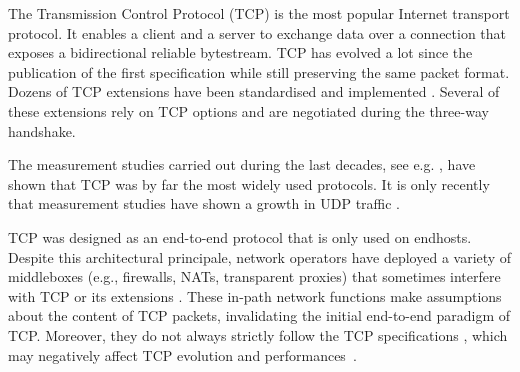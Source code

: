 
The Transmission Control Protocol (TCP) \cite{rfc793} is the most
popular Internet transport protocol. It enables a client and a server
to exchange data over a connection that exposes a bidirectional
reliable bytestream. 
TCP has evolved a lot since the publication of
the first specification while still preserving the same packet
format. Dozens of TCP extensions have been standardised and
implemented \cite{RFC7414}. Several of these extensions rely on TCP
options and are negotiated during the three-way handshake.

The measurement studies carried out during the last decades, see
e.g. \cite{paxson1994growth,claffy1993traffic,maier2009dominant,trevisan2020five},
have shown that TCP was by far the most widely used protocols. It is
only recently that measurement studies have shown a growth in UDP
traffic \cite{trevisan2020five}.  



TCP was designed as an end-to-end protocol that is only used on
endhosts. Despite this architectural principale, network operators
have deployed a variety of middleboxes (e.g., firewalls, NATs, transparent
proxies) that sometimes interfere with TCP or its extensions
\cite{medina2004measuring, honda2011still, edeline2019bottom}.
These in-path network functions make assumptions about the content of TCP
packets, invalidating the initial end-to-end paradigm of TCP.
Moreover, they do not always strictly follow the TCP specifications
\cite{honda2011still, hesmans2013tcp}, which may negatively affect
TCP evolution and performances~\cite{edeline2020evaluating}.






